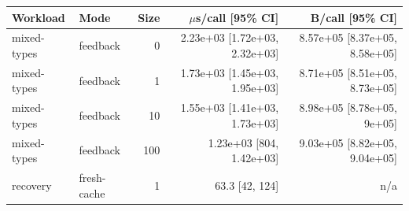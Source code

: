 \begin{tabular}{llrrr}
\toprule Workload & Mode & Size & $\mu$s/call [95\% CI] & B/call [95\% CI] \\
\midrule
mixed-types & feedback & 0 & 2.23e+03 [1.72e+03, 2.32e+03] & 8.57e+05 [8.37e+05, 8.58e+05] \\
mixed-types & feedback & 1 & 1.73e+03 [1.45e+03, 1.95e+03] & 8.71e+05 [8.51e+05, 8.73e+05] \\
mixed-types & feedback & 10 & 1.55e+03 [1.41e+03, 1.73e+03] & 8.98e+05 [8.78e+05, 9e+05] \\
mixed-types & feedback & 100 & 1.23e+03 [804, 1.42e+03] & 9.03e+05 [8.82e+05, 9.04e+05] \\
recovery & fresh-cache & 1 & 63.3 [42, 124] & n/a \\
\bottomrule
\end{tabular}
